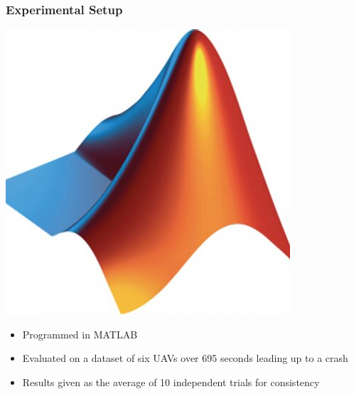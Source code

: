 \documentclass{beamer}
\begin{document}
\begin{frame}
\frametitle{Experimental Setup}
\begin{center}
\includegraphics[width=.2\textwidth]{ml}
\end{center}
\begin{itemize}
\item Programmed in MATLAB
\item Evaluated on a dataset of six UAVs over 695 seconds leading up to a crash
\item Results given as the average of 10 independent trials for consistency
\end{itemize}
\end{frame}
\end{document}
